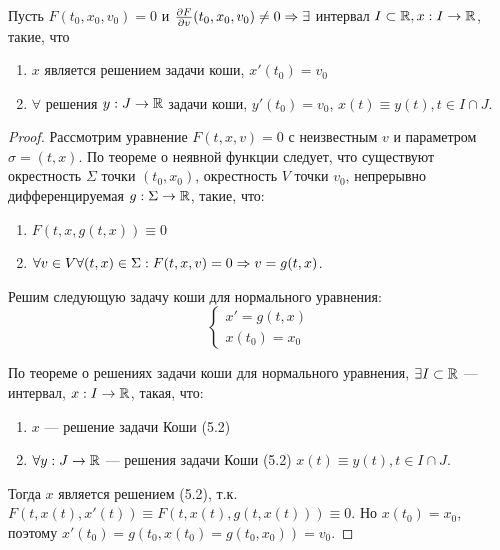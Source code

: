 \begin{theorem}
    Пусть \(F(t_0, x_0, v_0) = 0\) и \(\frac{\partial F}{\partial v}(t_0, x_0, v_0) \ne 0 \Rightarrow \exists\) интервал \(I \subset \mathbb{R}, x: I \rightarrow \mathbb{R}\), такие, что 
    \begin{enumerate}
        \item \(x\) является решением задачи коши, \(x'(t_0) = v_0\)
        \item \(\forall\) решения \(y: J \rightarrow \mathbb{R}\) задачи коши, \(y'(t_0) = v_0\), \(x(t) \equiv y(t), t \in I \cap J\).
    \end{enumerate}
\end{theorem}
\begin{proof}
    Рассмотрим уравнение \(F(t, x, v) = 0\) с неизвестным \(v\) и параметром \(\sigma = (t, x)\). По теореме о неявной функции следует, что существуют окрестность \(\Sigma\) точки \((t_0, x_0)\), окрестность \(V\) точки \(v_0\), непрерывно дифференцируемая \(g: \Sigma \rightarrow \mathbb{R}\), такие, что:
    \begin{enumerate}
        \item \(F(t, x, g(t, x)) \equiv 0\)
        \item \(\forall v \in V \forall (t, x) \in \Sigma: F(t, x, v) = 0 \Rightarrow v = g(t, x)\).
    \end{enumerate}
    Решим следующую задачу коши для нормального уравнения:
    \begin{equation}
        \begin{cases}
            x' = g(t, x) \\
            x(t_0) = x_0
        \end{cases}
    \end{equation}

    По теореме о решениях задачи коши для нормального уравнения, \(\exists I \subset \mathbb{R}\) --- интервал, \(x: I \rightarrow \mathbb{R}\), такая, что:
    \begin{enumerate}
        \item \(x\) --- решение задачи Коши (5.2)
        \item \(\forall y: J \rightarrow \mathbb{R}\) --- решения задачи Коши (5.2) \(x(t) \equiv y(t), t \in I \cap J\).
    \end{enumerate}
    Тогда \(x\) является решением (5.2), т.к. \(F(t, x(t), x'(t)) \equiv F(t, x(t), g(t, x(t))) \equiv 0\). Но \(x(t_0) = x_0\), поэтому \(x'(t_0) = g(t_0, x(t_0) = g(t_0, x_0)) = v_0\).


\end{proof}
